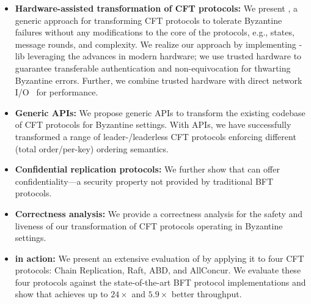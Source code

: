 \begin{itemize}[align=left,leftmargin=*,]
    \item {\bf Hardware-assisted transformation of CFT protocols:} We present \projecttitle{}, a generic approach for transforming CFT protocols to tolerate Byzantine failures without any modifications to the core of the protocols, e.g., states, message rounds, and complexity. We realize our approach by implementing \projecttitle{}-lib leveraging the advances in modern hardware; we use trusted hardware to guarantee transferable authentication and non-equivocation for thwarting Byzantine errors. Further, we combine trusted hardware with direct network I/O~\cite{rdma, dpdk} for performance.

    \item {\bf Generic \projecttitle{} APIs:} We propose generic \projecttitle{} APIs to transform the existing codebase of CFT protocols for Byzantine settings. With \projecttitle{} APIs, we have successfully transformed a range of leader-/leaderless CFT protocols enforcing different (total order/per-key) ordering semantics. 
    
    \item {\bf Confidential replication protocols:} We further show that \projecttitle{} can offer confidentiality---a security property not provided by traditional BFT protocols.
    
    \item {\bf Correctness analysis:}  We provide a correctness analysis for the safety and liveness of our transformation of CFT protocols operating in Byzantine settings. %

    \item {\bf \projecttitle{} in action:} We present an extensive evaluation of \projecttitle{} by applying it to four CFT protocols: Chain Replication, Raft, ABD, and AllConcur. We evaluate these four protocols against the state-of-the-art BFT protocol implementations and show that \projecttitle{} achieves up to $24\times$ and $5.9\times$ better throughput.

\end{itemize}

